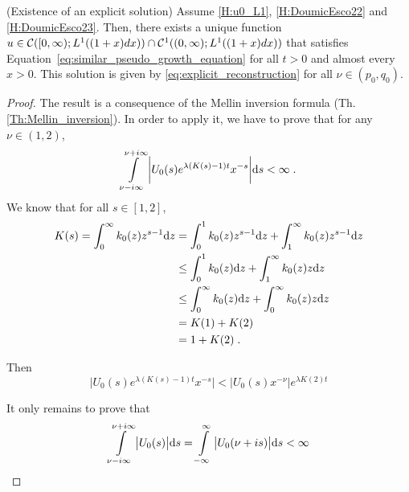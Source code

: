\documentclass[11pt]{amsart}
\begin{document}
\begin{theorem}(Existence of an explicit solution) Assume \eqref{H:u0_L1}, \eqref{H:DoumicEsco22} and \eqref{H:DoumicEsco23}.
Then, there exists a unique function $u \in \mathcal{C}([0, \infty); L^1((1+x)dx)) \cap \mathcal{C}^1((0, \infty); L^1((1+x)dx))$ that satisfies Equation~\eqref{eq:similar_pseudo_growth_equation} for all $t > 0$ and almost every $x > 0$. This solution is given by \eqref{eq:explicit_reconstruction} for all $\nu \in (p_0, q_0)$.
\end{theorem}
\begin{proof}
The result is a consequence of the Mellin inversion formula (Th. \ref{Th:Mellin_inversion}).
In order to apply it, we have to prove that for any $\nu \in (1, 2)$, 
    \begin{equation*}
        \int\limits_{\nu - i \infty}^{\nu + i \infty} \bigg| U_0(s) e^{\lambda(K(s) - 1) t} x^{-s} \bigg| \mathrm ds < \infty
        \; .
    \end{equation*}
We know that for all $s \in [1, 2]$, 
    \begin{align*}
        K(s) = \int_{0}^{\infty} k_0(z) z^{s-1} \mathrm dz
        &= \int_{0}^{1} k_0(z) z^{s-1} \mathrm dz +  \int_{1}^{\infty} k_0(z) z^{s-1} \mathrm dz \\
        &\leq \int_{0}^{1} k_0(z) \mathrm dz +  \int_{1}^{\infty} k_0(z) z \mathrm dz \\
        &\leq \int_{0}^{\infty} k_0(z) \mathrm dz +  \int_{0}^{\infty} k_0(z) z \mathrm dz \\
        &= K(1) + K(2) \\
        &= 1 + K(2)
        \; .
    \end{align*}
    
Then 
    \begin{equation*}
         \bigg| U_0(s) e^{\lambda(K(s) - 1) t} x^{-s} \bigg|  <   \bigg| U_0(s)  x^{-\nu} \bigg| e^{\lambda K(2) t}
    \end{equation*}

It only remains to prove that 
    \begin{equation}
            \int\limits_{\nu - i \infty}^{\nu + i \infty} \big| U_0(s)\big| \mathrm ds 
            = 
            \int\limits_{-\infty}^{\infty} \big| U_0(\nu + is)\big| \mathrm ds
            < \infty
            \label{eq:DouEsc43}
    \end{equation}


\end{proof}
\end{document}
